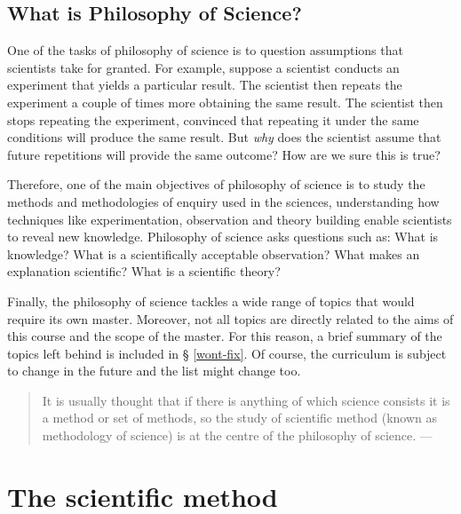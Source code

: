 \documentclass[
]{book}
\begin{document}
\hypertarget{what-is-philosophy-of-science}{%
\subsection{What is Philosophy of Science?}\label{what-is-philosophy-of-science}}

One of the tasks of philosophy of science is to question assumptions that scientists take for granted. For example, suppose a scientist conducts an experiment that yields a particular result. The scientist then repeats the experiment a couple of times more obtaining the same result. The scientist then stops repeating the experiment, convinced that repeating it under the same conditions will produce the same result. But \emph{why} does the scientist assume that future repetitions will provide the same outcome? How are we sure this is true?

Therefore, one of the main objectives of philosophy of science is to study the methods and methodologies of enquiry used in the sciences, understanding how techniques like experimentation, observation and theory building enable scientists to reveal new knowledge. Philosophy of science asks questions such as: What is knowledge? What is a scientifically acceptable observation? What makes an explanation scientific? What is a scientific theory?

Finally, the philosophy of science tackles a wide range of topics that would require its own master. Moreover, not all topics are directly related to the aims of this course and the scope of the master. For this reason, a brief summary of the topics left behind is included in § \ref{wont-fix}. Of course, the curriculum is subject to change in the future and the list might change too.

\begin{quote}
It is usually thought that if there is anything of which science consists it is a method or set of methods, so the study of scientific method (known as methodology of science) is at the centre of the philosophy of science. --- \citep{ladyman2012understanding}
\end{quote}

\hypertarget{sci-method}{%
\section{The scientific method}\label{sci-method}}
\end{document}
